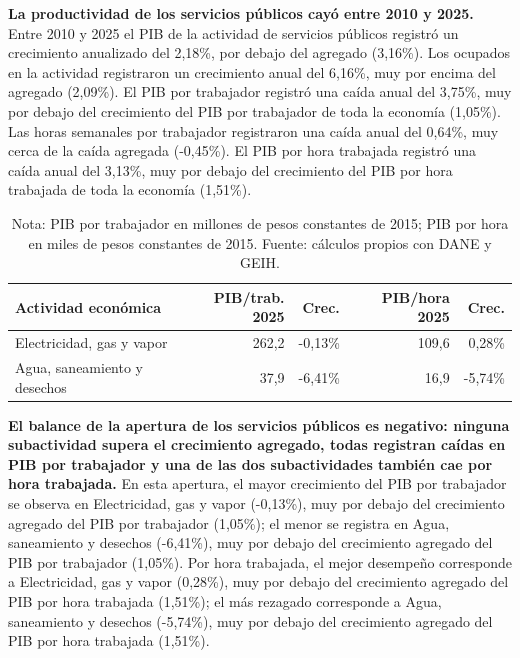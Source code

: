 \textbf{La productividad de los servicios públicos cayó entre 2010 y 2025.} Entre 2010 y 2025 el PIB de la actividad de servicios públicos registró un crecimiento anualizado del 2,18\%, por debajo del agregado (3,16\%). Los ocupados en la actividad registraron un crecimiento anual del 6,16\%, muy por encima del agregado (2,09\%). El PIB por trabajador registró una caída anual del 3,75\%, muy por debajo del crecimiento del PIB por trabajador de toda la economía (1,05\%). Las horas semanales por trabajador registraron una caída anual del 0,64\%, muy cerca de la caída agregada (-0,45\%). El PIB por hora trabajada registró una caída anual del 3,13\%, muy por debajo del crecimiento del PIB por hora trabajada de toda la economía (1,51\%).

\begin{table}[H]
\centering
\caption{Productividad laboral de las actividades de servicios públicos, 2010--2025}
\label{tab:sector_d_e_zoom25}
\small
\begin{tabular}{p{}rrrr}
\toprule
Actividad económica & PIB/trab. 2025 & Crec. & PIB/hora 2025 & Crec. \\
\midrule
Electricidad, gas y vapor & 262,2 & -0,13\% & 109,6 & 0,28\% \\
Agua, saneamiento y desechos & 37,9 & -6,41\% & 16,9 & -5,74\% \\
\bottomrule
\end{tabular}
\caption*{\footnotesize Nota: PIB por trabajador en millones de pesos constantes de 2015; PIB por hora en miles de pesos constantes de 2015. Fuente: cálculos propios con DANE y GEIH.}
\end{table}

\textbf{El balance de la apertura de los servicios públicos es negativo: ninguna subactividad supera el crecimiento agregado, todas registran caídas en PIB por trabajador y una de las dos subactividades también cae por hora trabajada.} En esta apertura, el mayor crecimiento del PIB por trabajador se observa en Electricidad, gas y vapor (-0,13\%), muy por debajo del crecimiento agregado del PIB por trabajador (1,05\%); el menor se registra en Agua, saneamiento y desechos (-6,41\%), muy por debajo del crecimiento agregado del PIB por trabajador (1,05\%). Por hora trabajada, el mejor desempeño corresponde a Electricidad, gas y vapor (0,28\%), muy por debajo del crecimiento agregado del PIB por hora trabajada (1,51\%); el más rezagado corresponde a Agua, saneamiento y desechos (-5,74\%), muy por debajo del crecimiento agregado del PIB por hora trabajada (1,51\%).

